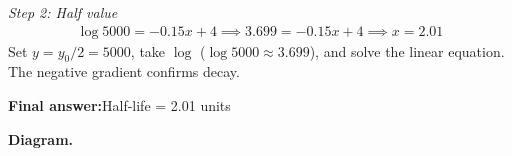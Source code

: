 \documentclass[11pt]{article}
\begin{document}
\textit{Step 2: Half value}
\[\begin{gathered}
\log 5000 = -0.15x + 4 \implies 3.699 = -0.15x + 4 \implies x = 2.01
\end{gathered}\]
Set \( y = y_{0}/2 = 5000 \), take \( \log \) (\( \log 5000 \approx 3.699 \)), and solve the linear equation. The negative gradient confirms decay.

\begin{answerbox}
\textbf{Final answer:}\quad Half-life = 2.01 units
\end{answerbox}
\textbf{Diagram.}

\begin{center}
\end{center}
\end{document}
